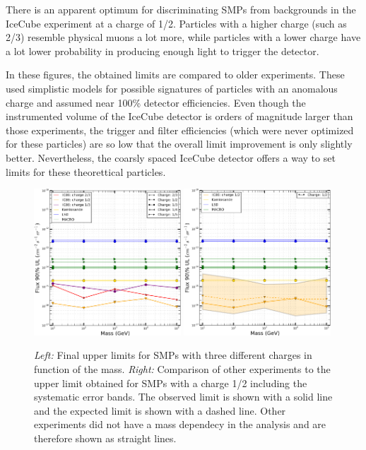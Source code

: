 There is an apparent optimum for discriminating SMPs from backgrounds in the IceCube experiment at a charge of 1/2. Particles with a higher charge (such as 2/3) resemble physical muons a lot more, while particles with a lower charge have a lot lower probability in producing enough light to trigger the detector.

In these figures, the obtained limits are compared to older experiments. These used simplistic models for possible signatures of particles with an anomalous charge and assumed near 100\% detector efficiencies. Even though the instrumented volume of the IceCube detector is orders of magnitude larger than those experiments, the trigger and filter efficiencies (which were never optimized for these particles) are so low that the overall limit improvement is only slightly better. Nevertheless, the coarsly spaced IceCube detector offers a way to set limits for these theorettical particles.

\begin{figure}
\centering
\includegraphics[width=0.49\textwidth]{chapter8/img/UpperLimitPlot_massesOBSERVED.png}
\includegraphics[width=0.49\textwidth]{chapter8/img/UpperLimitPlot_masses_withunc_0p5}
\caption{\textit{Left: }Final upper limits for SMPs with three different charges in function of the mass. \textit{Right: }Comparison of other experiments to the upper limit obtained for SMPs with a charge 1/2 including the systematic error bands. The observed limit is shown with a solid line and the expected limit is shown with a dashed line. Other experiments did not have a mass dependecy in the analysis and are therefore shown as straight lines.}
\label{fig:moneyplot1}
\end{figure}

